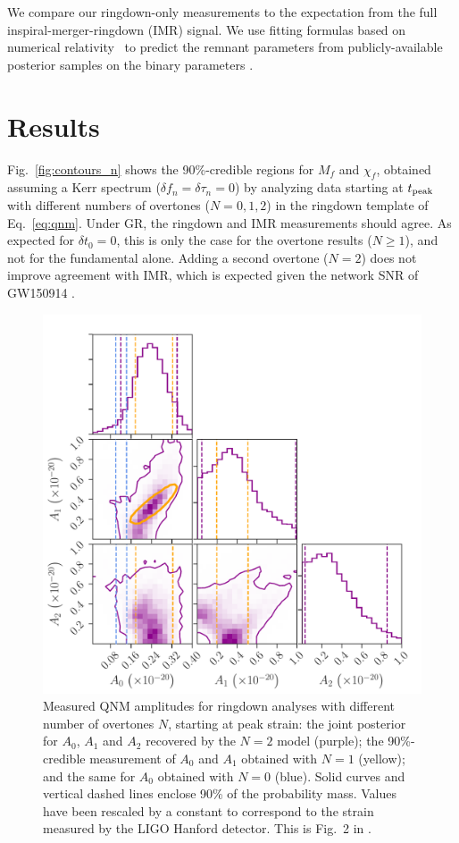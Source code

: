 \documentclass[letterpaper]{article}
\newcommand*{\eq}[1]{Eq.~\eqref{eq:#1}}
\newcommand*{\fig}[1]{Fig.~\ref{fig:#1}}
\newcommand{\mf}{M_f}
\newcommand{\chif}{\chi_f}
\newcommand{\tpeak}{t_{\rm peak}}
\begin{document}
We compare our ringdown-only measurements to the expectation from the full inspiral-merger-ringdown (IMR) signal.
We use fitting formulas based on numerical relativity~\cite{Varma:2018aht,Blackman:2017pcm} to predict the remnant parameters from publicly-available posterior samples on the binary parameters \cite{gwtc1:2018,GWOSC:GWTC}.

\section{Results}

\fig{contours_n} shows the 90\%-credible regions for $\mf$ and $\chif$, obtained assuming a Kerr spectrum ($\delta f_n = \delta \tau_n=0$) by analyzing data starting at $\tpeak$ with different numbers of overtones ($N=0,1,2$) in the ringdown template of \eq{qnm}.
Under GR, the ringdown and IMR measurements should agree.
As expected for $\delta t_0 = 0$, this is only the case for the overtone results ($N \geq 1$), and not for the fundamental alone.
Adding a second overtone ($N=2$) does not improve agreement with IMR, which is expected given the network SNR of GW150914 \cite{Giesler:2019uxc}.

\begin{figure}[bt]
\centering
\includegraphics[width=0.66\columnwidth,clip=true]{corner_gw150914_allamps_n0}
\caption{
Measured QNM amplitudes for ringdown analyses with different number of overtones $N$, starting at peak strain:
the joint posterior for $A_0$, $A_1$ and $A_2$ recovered by the $N=2$ model (purple);
the 90\%-credible measurement of $A_0$ and $A_1$ obtained with $N=1$ (yellow); and the same for $A_0$ obtained with $N=0$ (blue).
Solid curves and vertical dashed lines enclose 90\% of the probability mass.
Values have been rescaled by a constant to correspond to the strain measured by the LIGO Hanford detector.
This is Fig.~2 in \cite{Isi:2019aib}.
}
\label{fig:allamps}
\end{figure}
\end{document}
